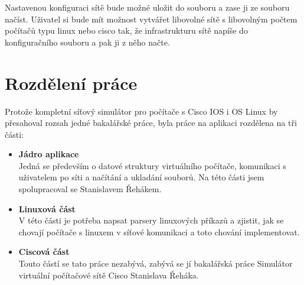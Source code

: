 Nastavenou konfiguraci sítě bude možné uložit do souboru a zase ji ze souboru načíst. Uživatel si bude mít možnost vytvářet libovolné sítě s libovolným počtem počítačů typu linux nebo cisco tak, že infrastrukturu sítě napíše do konfiguračního souboru a pak ji z něho načte.


\section{Rozdělení práce}

Protože kompletní síťový simulátor pro počítače s Cisco IOS i OS Linux by přesahoval rozsah jedné bakalářské práce, byla práce na aplikaci rozdělena na tři části:
\begin{itemize}
 \item \textbf{Jádro aplikace}\\ 
\indent Jedná se především o datové struktury virtuálního počítače, komunikaci s uživatelem po síti a načítání a ukladání souborů. Na této části jsem spolupracoval se Stanislavem Řehákem.
 \item \textbf{Linuxová část}\\
V této části je potřeba napsat parsery linuxových příkazů a  zjistit, jak se chovají počítače s linuxem v síťové komunikaci a toto chování implementovat.
 \item \textbf{Ciscová část}\\
Touto částí se tato práce nezabývá, zabývá se jí bakalářská práce Simulátor virtuální počítačové sítě Cisco Stanislava Řeháka.
\end{itemize}



